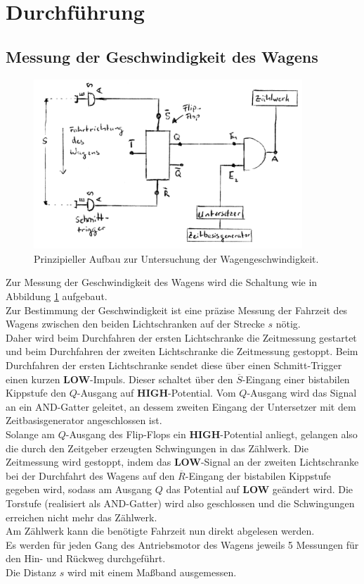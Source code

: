 \section{Durchführung}
\FloatBarrier
\label{sec:Durchführung}
\subsection{Messung der Geschwindigkeit des Wagens}
\label{sec:speedygonzales}
\begin{figure}
	\includegraphics[width=0.9\textwidth]{Bilder/geschwindigkeit_schaltung.png}
	\caption{Prinzipieller Aufbau zur Untersuchung der Wagengeschwindigkeit.}
	\label{fig:wagen} %
\end{figure}
Zur Messung der Geschwindigkeit des Wagens wird die Schaltung wie in Abbildung \ref{fig:wagen} aufgebaut.\\
Zur Bestimmung der Geschwindigkeit ist eine präzise Messung der Fahrzeit des Wagens zwischen den beiden Lichtschranken auf der Strecke $s$ nötig.\\
Daher wird beim Durchfahren der ersten Lichtschranke die Zeitmessung gestartet und beim Durchfahren der zweiten Lichtschranke die Zeitmessung gestoppt.
Beim Durchfahren der ersten Lichtschranke sendet diese über einen Schmitt-Trigger einen kurzen \textbf{LOW}-Impuls. Dieser schaltet über den $\overline{S}$-Eingang einer bistabilen Kippstufe den $Q$-Ausgang auf \textbf{HIGH}-Potential.
Vom $Q$-Ausgang wird das Signal an ein AND-Gatter geleitet,
an dessem zweiten Eingang der Untersetzer mit dem Zeitbasisgenerator angeschlossen ist. \\
Solange am $Q$-Ausgang des Flip-Flops ein \textbf{HIGH}-Potential anliegt, gelangen also die durch den Zeitgeber erzeugten Schwingungen in das Zählwerk.
Die Zeitmessung wird gestoppt, indem das \textbf{LOW}-Signal an der zweiten Lichtschranke  bei der Durchfahrt des Wagens auf den $\overline{R}$-Eingang der bistabilen Kippstufe gegeben wird,
sodass am Ausgang $Q$ das Potential auf \textbf{LOW} geändert wird. Die Torstufe (realisiert als AND-Gatter) wird also geschlossen und die Schwingungen erreichen nicht mehr das Zählwerk.\\
Am Zählwerk kann die benötigte Fahrzeit nun direkt abgelesen werden.\\
Es werden für jeden Gang des Antriebsmotor des Wagens jeweils 5 Messungen für den Hin- und Rückweg durchgeführt. \\
Die Distanz $s$ wird mit einem Maßband ausgemessen.

